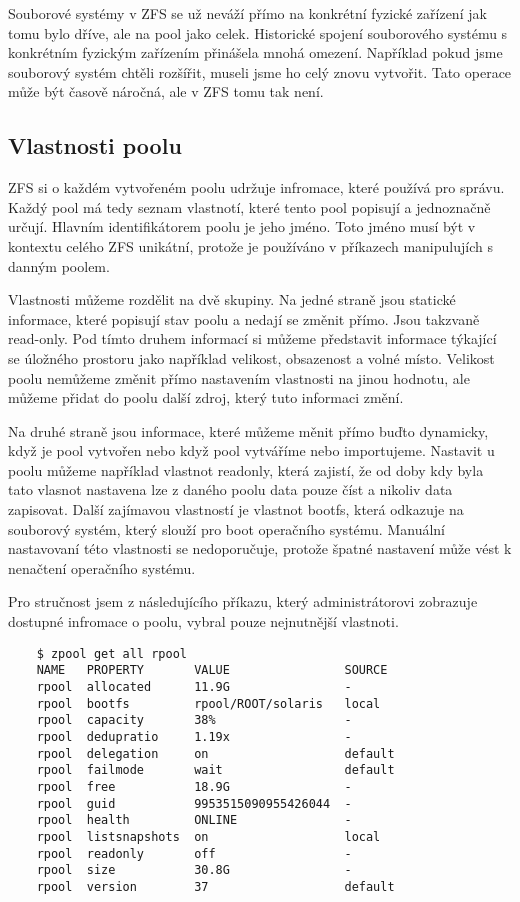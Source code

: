     Souborové systémy v ZFS se už neváží přímo na konkrétní fyzické zařízení jak tomu bylo dříve, ale na pool jako celek. Historické spojení souborového systému s konkrétním fyzickým zařízením přinášela mnohá omezení. Například pokud jsme souborový systém chtěli rozšířit, museli jsme ho celý znovu vytvořit. Tato operace může být časově náročná, ale
    v ZFS tomu tak není.
    \subsection{Vlastnosti poolu}
    ZFS si o každém vytvořeném poolu udržuje infromace, které používá pro správu. Každý pool má tedy seznam vlastnotí, které tento pool popisují a jednoznačně určují.
    Hlavním identifikátorem poolu je jeho jméno. Toto jméno musí být v kontextu celého ZFS unikátní, protože je používáno v příkazech manipulujích s danným poolem.

    Vlastnosti můžeme rozdělit na dvě skupiny. Na jedné straně jsou statické informace, které popisují stav poolu a nedají se změnit přímo. Jsou takzvaně read-only. Pod tímto druhem informací si můžeme představit informace týkající se úložného prostoru jako například velikost, obsazenost a volné místo. Velikost poolu nemůžeme změnit přímo nastavením vlastnosti na jinou hodnotu, ale můžeme přidat do poolu další zdroj, který tuto informaci změní.

    Na druhé straně jsou informace, které můžeme měnit přímo buďto dynamicky, když je pool vytvořen nebo když pool vytváříme nebo importujeme. Nastavit u poolu můžeme například vlastnot readonly, která zajistí, že od doby kdy byla tato vlasnot nastavena lze z daného poolu data pouze číst a nikoliv data zapisovat. Další zajímavou vlastností je vlastnot bootfs, která odkazuje na souborový systém, který slouží pro boot operačního systému. Manuální nastavovaní této vlastnosti se nedoporučuje, protože špatné nastavení může vést k nenačtení operačního systému.        

    Pro stručnost jsem z následujícího příkazu, který administrátorovi zobrazuje dostupné infromace o poolu, vybral pouze nejnutnější vlastnoti.
    \begin{verbatim}    
    $ zpool get all rpool
    NAME   PROPERTY       VALUE                SOURCE
    rpool  allocated      11.9G                -
    rpool  bootfs         rpool/ROOT/solaris   local
    rpool  capacity       38%                  -
    rpool  dedupratio     1.19x                -
    rpool  delegation     on                   default
    rpool  failmode       wait                 default
    rpool  free           18.9G                -
    rpool  guid           9953515090955426044  -
    rpool  health         ONLINE               -
    rpool  listsnapshots  on                   local
    rpool  readonly       off                  -
    rpool  size           30.8G                -
    rpool  version        37                   default
    \end{verbatim}

